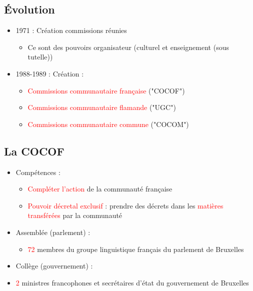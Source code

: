 \subsection{Évolution}
\begin{itemize}
	\item 1971 : Création commissions réunies
	\begin{itemize}
		\item Ce sont des pouvoirs organisateur (culturel et enseignement (sous tutelle))
	\end{itemize}
	\item 1988-1989 : Création :
	\begin{itemize}
		\item \textcolor{red}{Commissions communautaire française} ("COCOF")
		\item \textcolor{red}{Commissions communautaire flamande} ("UGC")
		\item \textcolor{red}{Commissions communautaire commune} ("COCOM")
	\end{itemize}
\end{itemize}

\subsection{La COCOF}
\begin{itemize}
	\item Compétences :
	\begin{itemize}
		\item \textcolor{red}{Compléter l'action} de la communauté française
		\item \textcolor{red}{Pouvoir décretal exclusif} : prendre des décrets dans les \textcolor{red}{matières transférées} par la communauté
   	\end{itemize}
   	\item Assemblée (parlement) :
   	\begin{itemize}
   		\item \textcolor{red}{72} membres du groupe linguistique français du parlement de Bruxelles
   	\end{itemize}
   	\item Collège (gouvernement) :
   	\item \textcolor{red}{2} ministres francophones et secrétaires d'état du gouvernement de Bruxelles
\end{itemize}

